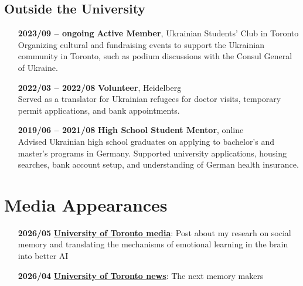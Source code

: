 \documentclass[12pt]{article}
\begin{document}
\subsection*{Outside the University}
\begin{itemize}
    \item[\textbf{2023/09 -- ongoing}] \textbf{Active Member}, Ukrainian Students' Club in Toronto \\ 
    Organizing cultural and fundraising events to support the Ukrainian community in Toronto, such as podium discussions with the Consul General of Ukraine.
    \item[\textbf{2022/03 -- 2022/08}] \textbf{Volunteer}, Heidelberg \\ 
    Served as a translator for Ukrainian refugees for doctor visits, temporary permit applications, and bank appointments.
    \item[\textbf{2019/06 -- 2021/08}] \textbf{High School Student Mentor}, online \\ 
    Advised Ukrainian high school graduates on applying to bachelor's and master's programs in Germany. Supported university applications, housing searches, bank account setup, and understanding of German health insurance.

\end{itemize}

\section*{Media Appearances}
\begin{itemize}
    \item[\textbf{2026/05}] \href{https://www.instagram.com/p/DYCtendkSTX/?img_index=3}{\textbf{University of Toronto media}}: Post about my researh on social memory and translating the mechanisms of emotional learning in the brain into better AI
    \item[\textbf{2026/04}] \href{https://www.utoronto.ca/news/toronto-researcher-found-where-memories-live-can-she-help-people-alzheimer-s-and-ptsd-too}{\textbf{University of Toronto news}}: The next memory makers
\end{itemize}

\end{document}

